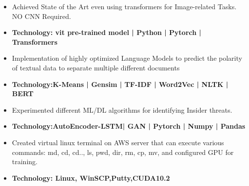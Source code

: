 
\begin{itemize}
\item Achieved State of the Art even using transformers for Image-related Tasks. NO CNN Required.
\item\bf{Technology}{: vit pre-trained model | Python | Pytorch | Transformers}
\end{itemize}
\smallskip
{}
\begin{itemize}
\item Implementation of highly optimized Language Models to predict the polarity of textual data to separate multiple different documents
\item\bf{Technology}{:K-Means | Gensim | TF-IDF | Word2Vec | NLTK | BERT }
\end{itemize}
\smallskip
{}
\begin{itemize}
\item Experimented different ML/DL algorithms for identifying Insider threats.
\item\bf{Technology}{:AutoEncoder-LSTM| GAN | Pytorch | Numpy | Pandas }
\end{itemize}
\smallskip
{}
\begin{itemize}
\item Created virtual linux terminal on AWS server that can execute various commands: md, cd, cd.., ls, pwd, dir, rm, cp, mv, and configured GPU for training.
\item\bf{Technology}{: Linux, WinSCP,Putty,CUDA10.2}
\end{itemize}
